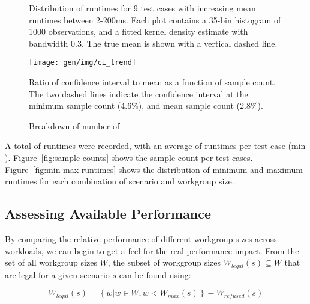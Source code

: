 \begin{figure}

\caption{%
  Distribution of runtimes for 9 test cases with increasing mean
  runtimes between 2-200ms. Each plot contains a 35-bin histogram of
  1000 observations, and a fitted kernel density estimate with
  bandwidth 0.3. The true mean is shown with a vertical dashed line. %
}
\label{fig:runtime-histograms}
\end{figure}

\begin{figure}
\centering
\texttt{[image: gen/img/ci\_trend]}
\caption{%
  Ratio of confidence interval to mean as a function of sample
  count. The two dashed lines indicate the confidence interval at the
  minimum sample count (4.6\%), and mean sample count (2.8\%).%
}
\label{fig:ci-trends}
\end{figure}


\begin{figure}
  
\caption{Breakdown of number of}
\label{fig:num-samples}
\end{figure}


A total of  runtimes were recorded, with an
average of  runtimes per test case (min
). Figure~\ref{fig:sample-counts} shows
the sample count per test cases. Figure~\ref{fig:min-max-runtimes}
shows the distribution of minimum and maximum runtimes for each
combination of scenario and workgroup size.



\subsection{Assessing Available Performance}

By comparing the relative performance of different workgroup sizes
across workloads, we can begin to get a feel for the real performance
impact. From the set of all workgroup sizes $W$, the subset of
workgroup sizes $W_{legal}(s) \subseteq W$ that are legal for a given
scenario $s$ can be found using:

\begin{equation}
  W_{legal}(s) = \left\{w | w \in W, w < W_{max}(s) \right\} - W_{refused}(s)
\end{equation}

